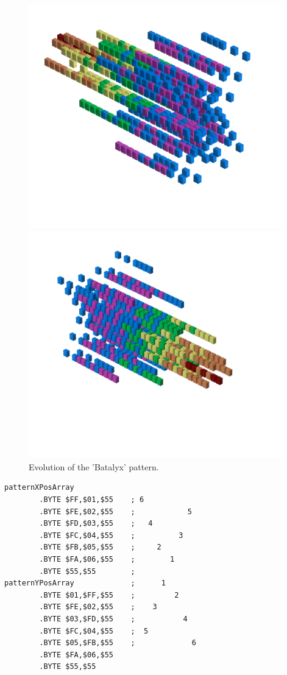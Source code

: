\begin{figure}[H]
    \centering
    \begin{adjustbox}{width=11cm,center}
      \includegraphics[width=11cm]{src/batalyx_patterns/pattern0-45.png}%
    \end{adjustbox}
    \begin{adjustbox}{width=11cm,margin=0cm -2cm}
      \includegraphics[width=11cm]{src/batalyx_patterns/pattern0-225.png}%
    \end{adjustbox}
\caption{Evolution of the 'Batalyx' pattern.}
\end{figure}

\begin{lstlisting}[caption=Source code for the Batalyx pattern..]
patternXPosArray             
        .BYTE $FF,$01,$55    ; 6              
        .BYTE $FE,$02,$55    ;            5   
        .BYTE $FD,$03,$55    ;   4            
        .BYTE $FC,$04,$55    ;          3     
        .BYTE $FB,$05,$55    ;     2          
        .BYTE $FA,$06,$55    ;        1       
        .BYTE $55,$55        ;                
patternYPosArray             ;      1         
        .BYTE $01,$FF,$55    ;         2      
        .BYTE $FE,$02,$55    ;    3           
        .BYTE $03,$FD,$55    ;           4    
        .BYTE $FC,$04,$55    ;  5             
        .BYTE $05,$FB,$55    ;             6 
        .BYTE $FA,$06,$55
        .BYTE $55,$55
\end{lstlisting}

